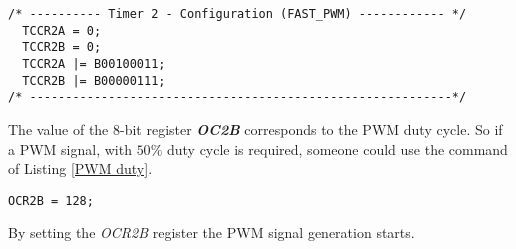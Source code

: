 \begin{lstlisting}[style=My_Arduino, label = PWM setup, caption = Timer2 setup for Fast PWM]
/* ---------- Timer 2 - Configuration (FAST_PWM) ------------ */
  TCCR2A = 0;
  TCCR2B = 0;    
  TCCR2A |= B00100011;
  TCCR2B |= B00000111;
/* -----------------------------------------------------------*/
\end{lstlisting}


The value of the 8-bit register \textit{\textbf{OC2B}} corresponds to the PWM duty cycle. So if a PWM signal, with $50\%$ duty cycle is required, someone could use the command of Listing \ref{PWM duty}.


\begin{lstlisting}[style=My_Arduino, label = PWM duty, caption = Setup of PWM duty-cycle]
OCR2B = 128;
\end{lstlisting}

\noindent By setting the \textit{OCR2B} register the PWM signal generation starts.
